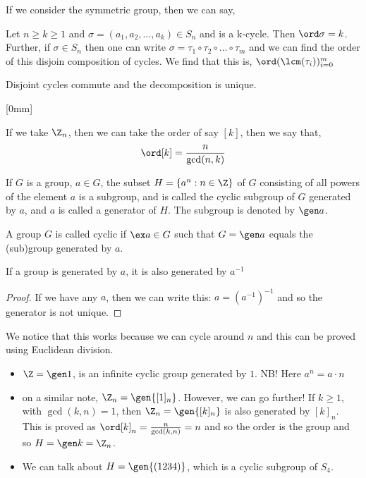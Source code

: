 If we consider the symmetric group, then we can say,
\begin{nlemma}
  Let $n \ge k \ge 1$ and $\sigma = (a_1, a_2, \dots, a_k) \in S_n$ and is a k-cycle. Then $\ord \sigma = k$. Further, if $\sigma \in S_n$ then one can write $\sigma = \tau_1 \circ \tau_2 \circ \dots \circ \tau_m$ and we can find the order of this disjoin composition of cycles. We find that this is, $\ord (\lcm(\tau_i))_{i=0}^m$
\end{nlemma}

\begin{remark}
   Disjoint cycles commute and the decomposition is unique.
\end{remark}[0mm]

\begin{nlemma}
  If we take $\Z_n$, then we can take the order of say $[k]$, then we say that,
  $$ \ord [k] = \frac{n}{\gcd (n, k)} $$
\end{nlemma}

\begin{ndefi}[Generator]
  If $G$ is a group, $a\in G$, the subset $H = \{a^n : n \in \Z\}$ of $G$ consisting of all powers of the element $a$ is a subgroup, and is called the cyclic subgroup of $G$ generated by $a$, and $a$ is called a generator of $H$. The subgroup is denoted by $\gen a$.
\end{ndefi}


\begin{ndefi}
  A group $G$ is called cyclic if $\ex a \in G$ such that $G = \gen a$ equals the (sub)group generated by $a$.
\end{ndefi}

\begin{nlemma}
  If a group is generated by $a$, it is also generated by $a^{-1}$
\end{nlemma}
\begin{proof}
  If we have any $a$, then we can write this: $a = (a^{-1})^{-1}$ and so the generator is not unique.
\end{proof}

\noindent
We notice that this works because we can cycle around $n$ and this can be proved using Euclidean division.


\begin{eg}
  \begin{itemize}
    \item $\Z = \gen 1$, is an infinite cyclic group generated by $1$. NB! Here $a^n = a \cdot n$
    \item on a similar note, $\Z_n = \gen {[1]_n}$. However, we can go further! If $k \ge 1$, with $\gcd (k, n) = 1$, then $\Z_n = \gen {[k]_n}$ is also generated by $[k]_n$. This is proved as $\ord [k]_n = \frac{n}{\gcd (k, n)} = n$ and so the order is the group and so $H = \gen k = \Z_n$.
    \item We can talk about $H = \gen {(1234)}$, which is a cyclic subgroup of $S_4$.
  \end{itemize}
\end{eg}

